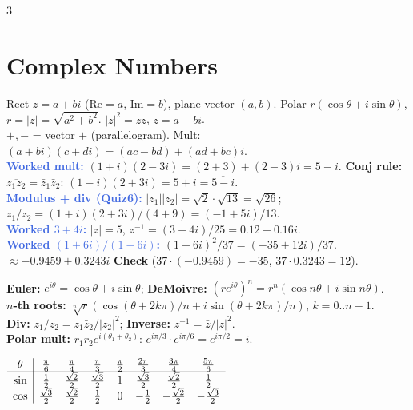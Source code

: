 \documentclass[9pt]{extarticle}
\newcommand{\hl}[1]{\textbf{\textcolor{BrickRed}{#1}}}
\newcommand{\wk}[1]{\textbf{\textcolor{OliveGreen}{#1}}}
\newcommand{\ex}[1]{\textbf{\textcolor{RoyalBlue}{#1}}}
\begin{document}
\begin{multicols}{3}
\section{Complex Numbers}
\begin{sloppypar}\raggedright
Rect $z{=}a{+}bi$ (Re${=}a$, Im${=}b$), plane vector $(a,b)$. Polar $r(\cos\theta{+}i\sin\theta)$, $r{=}|z|{=}\sqrt{a^2{+}b^2}$. $|z|^2{=}z\bar z$, $\bar z{=}a{-}bi$.\\
$+,-$ = vector $+$ (parallelogram). Mult: $(a{+}bi)(c{+}di){=}(ac{-}bd){+}(ad{+}bc)i$.\\
\ex{Worked mult:} $(1{+}i)(2{-}3i){=}(2{+}3){+}(2{-}3)i{=}5{-}i$. \hl{Conj rule:} $\overline{z_1z_2}{=}\bar z_1\bar z_2$: $(1{-}i)(2{+}3i){=}5{+}i{=}\overline{5{-}i}$.\\
\ex{Modulus + div (Quiz6):} $|z_1||z_2|{=}\sqrt2{\cdot}\sqrt{13}{=}\sqrt{26}$; $z_1/z_2{=}(1{+}i)(2{+}3i)/(4{+}9){=}({-}1{+}5i)/13$.\\
\ex{Worked $3{+}4i$:} $|z|{=}5$, $z^{-1}{=}(3{-}4i)/25{=}0.12{-}0.16i$.\\
\ex{Worked $(1{+}6i)/(1{-}6i)$:} $(1{+}6i)^2/37{=}({-}35{+}12i)/37$.\\
${\approx}{-}0.9459{+}0.3243i$ \wk{Check} ($37{\cdot}({-}0.9459){=}{-}35$, $37{\cdot}0.3243{=}12$).\\
\end{sloppypar}
\begin{kbox}\raggedright
\textbf{Euler:} \hl{$e^{i\theta}{=}\cos\theta{+}i\sin\theta$}; \textbf{DeMoivre:} \hl{$(re^{i\theta})^n{=}r^n(\cos n\theta{+}i\sin n\theta)$}.\\
\textbf{$n$-th roots:} \hl{$\sqrt[n]{r}(\cos(\theta{+}2k\pi)/n{+}i\sin(\theta{+}2k\pi)/n)$}, $k{=}0..n{-}1$.\\
\textbf{Div:} \hl{$z_1/z_2{=}z_1\bar z_2/|z_2|^2$}; \textbf{Inverse:} \hl{$z^{-1}{=}\bar z/|z|^2$}.\\
\textbf{Polar mult:} \hl{$r_1r_2e^{i(\theta_1+\theta_2)}$}: $e^{i\pi/3}{\cdot}e^{i\pi/6}{=}e^{i\pi/2}{=}i$.
\end{kbox}
\begin{center}\scriptsize
${\renewcommand{\arraystretch}{0.9}\begin{array}{c|ccccccc}\theta&\frac\pi6&\frac\pi4&\frac\pi3&\frac\pi2&\frac{2\pi}3&\frac{3\pi}4&\frac{5\pi}6\\\hline\sin&\frac12&\frac{\sqrt2}2&\frac{\sqrt3}2&1&\frac{\sqrt3}2&\frac{\sqrt2}2&\frac12\\\cos&\frac{\sqrt3}2&\frac{\sqrt2}2&\frac12&0&{-}\frac12&{-}\frac{\sqrt2}2&{-}\frac{\sqrt3}2\end{array}}$

\end{center}
\end{multicols}
\end{document}
